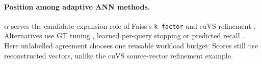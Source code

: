 \paragraph{Position among adaptive ANN methods.}
$\alpha$ serves the candidate-expansion role of Faiss's \texttt{k\_factor} and cuVS refinement \cite{faiss_refine,cuvs_refinement}. Alternatives use GT tuning \cite{faiss_autotune}, learned per-query stopping \cite{li_termination} or predicted recall \cite{darth}. Here unlabelled agreement chooses one reusable workload budget. Scores still use reconstructed vectors, unlike the cuVS source-vector refinement example.